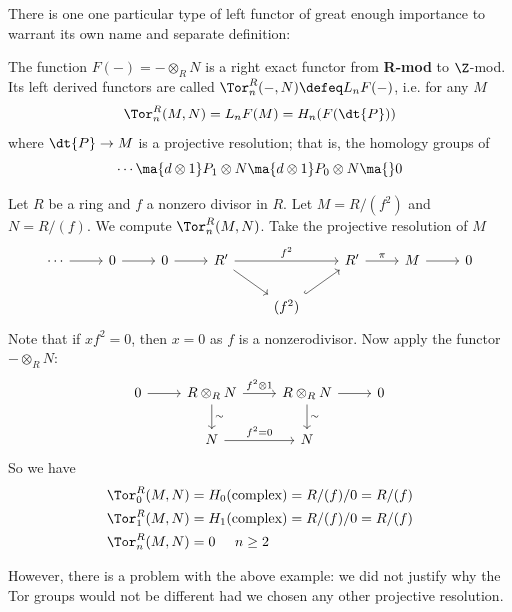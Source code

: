 There is one one particular type of left functor of great enough importance to warrant its own name and separate definition:

\begin{dfn}[Tor]
The function $F(-)= - \otimes_R N$ is a right exact functor from \textbf{R-mod} to $\Z$-mod. Its left derived functors are called $\Tor^R_n(-,N) \defeq L_nF(-)$, i.e. for any $M$
\[
\Tor_n^R(M,N)= L_nF(M)=H_n(F(\dt{P}))
\]
where $\dt{P} \to M$ is a projective resolution; that is, the homology groups of 
\[
\cdots \ma{d \otimes 1} P_1 \otimes N \ma{d \otimes 1} P_0 \otimes N \ma{} 0 
\]
\end{dfn}

\begin{ex}
Let $R$ be a ring and $f$ a nonzero divisor in $R$. Let $M=R/(f^2)$ and $N=R/(f)$. We compute $\Tor_n^R(M,N)$. Take the projective resolution of $M$
\[
\begin{tikzcd}
\cdots \arrow{r} & 0 \arrow{r} & 0 \arrow{r} & R' \arrow{rr}{f^2} \arrow{dr} & & R' \arrow{r}{\pi} & M \arrow{r} & 0 \\
& & & & (f^2) \arrow[hook]{ur} & & & 
\end{tikzcd}
\]
Note that if $xf^2=0$, then $x=0$ as $f$ is a nonzerodivisor. Now apply the functor $- \otimes_R N$:
\[
\begin{tikzcd} 
0 \arrow{r} & R \otimes_R N \arrow{r}{f^2 \otimes 1} \arrow{d}{\sim} & R \otimes_R N \arrow{r} \arrow{d}{\sim} & 0 \\
& N \arrow{r}{f^2=0} & N & 
\end{tikzcd}
\]
So we have
\[
\begin{split}
\Tor_0^R(M,N)&=H_0(\text{complex})=R/(f)/0=R/(f) \\
\Tor_1^R(M,N)&=H_1(\text{complex})=R/(f)/0=R/(f) \\
\Tor_n^R(M,N)&=0 \;\;\;\;\; n \geq 2
\end{split}
\]
\end{ex}

However, there is a problem with the above example: we did not justify why the Tor groups would not be different had we chosen any other projective resolution. 

